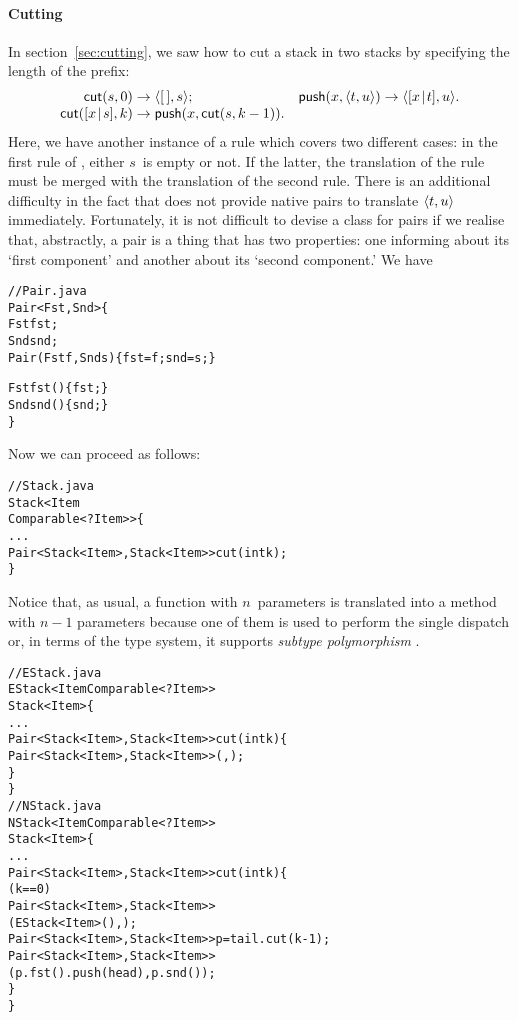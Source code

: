\paragraph{Cutting}

In section~\vref{sec:cutting}, we saw how to cut a stack in two stacks
by specifying the length of the prefix:
\begin{equation*}
\begin{array}{@{}r@{\;}l@{\;}lr@{\;}l@{\;}l@{}}
\fun{cut}(s,0) & \rightarrow & \pair{\el}{s};
& \fun{push}(x,\pair{t}{u}) & \rightarrow & \pair{\cons{x}{t}}{u}.\\
\fun{cut}(\cons{x}{s},k) & \rightarrow 
& \fun{push}(x,\fun{cut}(s,k-1)).
\end{array}
\end{equation*}
Here, we have another instance of a rule which covers two different
cases: in the first rule of , either \(s\)~is empty or
not. If the latter, the translation of the rule must be merged with
the translation of the second rule. There is an additional difficulty
in the fact that \Java does not provide native pairs to translate
\(\langle{t},{u}\rangle\) immediately. Fortunately, it is not difficult to
devise a class for pairs if we realise that, abstractly, a pair is a
thing that has two properties: one informing about its `first
component' and another about its `second component.' We have
\begin{alltt}
// Pair.java
\public \class Pair<Fst,Snd> \{
  \protectedX \final Fst fst;
  \protectedX \final Snd snd;
  \public Pair(\final Fst f, \final Snd s) \{fst = f; snd = s;\}

  \public Fst fst() \{ \return fst; \}
  \public Snd snd() \{ \return snd; \}
\}
\end{alltt}
Now we can proceed as follows:
\begin{alltt}
// Stack.java
\public \abstractX \class Stack<Item
\hfill\extends Comparable<? \super Item>> \{
  ...
  \public \abstractX
            Pair<Stack<Item>,Stack<Item>> cut(\final int k);
\}
\end{alltt}
Notice that, as usual, a function with \(n\)~parameters is translated
into a method with \(n-1\) parameters because one of them is used to
perform the single dispatch or, in terms of the type system, it
supports \emph{subtype polymorphism} \citep{Pierce_2002}.
\begin{alltt}
// EStack.java
\public \class EStack<Item \extends Comparable<? \super Item>> 
       \extends Stack<Item> \{
  ...
  \public Pair<Stack<Item>,Stack<Item>> cut(\final int k) \{
    \return \new Pair<Stack<Item>,Stack<Item>>(\this,\this);
  \}
\}
// NStack.java
\public \class NStack<Item \extends Comparable<? \super Item>>
       \extends Stack<Item> \{
  ...
  \public Pair<Stack<Item>,Stack<Item>> cut(\final int k) \{
    \ifX (k == 0)
       \return \new Pair<Stack<Item>,Stack<Item>>
                      (\new EStack<Item>(),\this);
    Pair<Stack<Item>,Stack<Item>> p = tail.cut(k-1);
    \return \new Pair<Stack<Item>,Stack<Item>>
                   (p.fst().push(head),p.snd());
  \}
\}
\end{alltt}
